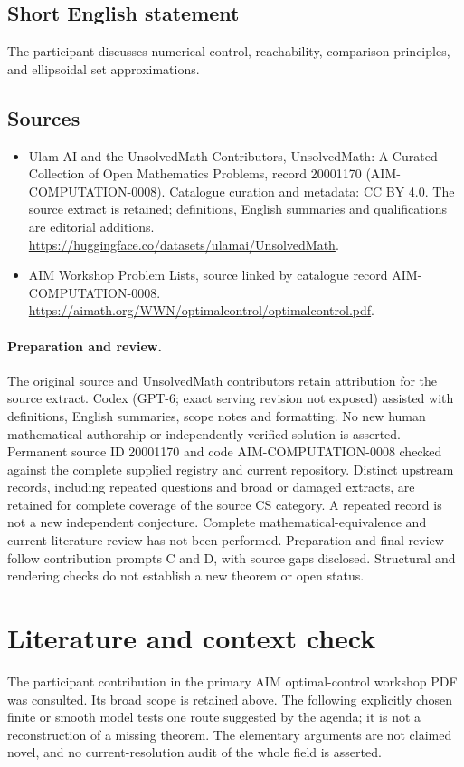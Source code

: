 \documentclass[11pt]{article}
\begin{document}
\subsection{Short English statement}
The participant discusses numerical control, reachability, comparison principles, and ellipsoidal set approximations.
\subsection{Sources}
\begin{itemize}
\item[S1] Ulam AI and the UnsolvedMath Contributors, UnsolvedMath: A Curated Collection of Open Mathematics Problems, record 20001170 (AIM-COMPUTATION-0008). Catalogue curation and metadata: CC BY 4.0. The source extract is retained; definitions, English summaries and qualifications are editorial additions.
\url{https://huggingface.co/datasets/ulamai/UnsolvedMath}.
\item[S2] AIM Workshop Problem Lists, source linked by catalogue record AIM-COMPUTATION-0008.
\url{https://aimath.org/WWN/optimalcontrol/optimalcontrol.pdf}.
\end{itemize}
\paragraph{Preparation and review.}
The original source and UnsolvedMath contributors retain attribution for the source extract. Codex (GPT-6; exact serving revision not exposed) assisted with definitions, English summaries, scope notes and formatting. No new human mathematical authorship or independently verified solution is asserted. Permanent source ID 20001170 and code AIM-COMPUTATION-0008 checked against the complete supplied registry and current repository. Distinct upstream records, including repeated questions and broad or damaged extracts, are retained for complete coverage of the source CS category. A repeated record is not a new independent conjecture. Complete mathematical-equivalence and current-literature review has not been performed. Preparation and final review follow contribution prompts C and D, with source gaps disclosed. Structural and rendering checks do not establish a new theorem or open status.
\label{end:20001170}

\section{Literature and context check}
The participant contribution in the primary AIM optimal-control workshop
 PDF was consulted. Its broad scope is retained above. The following explicitly
 chosen finite or smooth model tests one route suggested by the agenda; it is
 not a reconstruction of a missing theorem. The elementary arguments are not
 claimed novel, and no current-resolution audit of the whole field is asserted.
\end{document}
